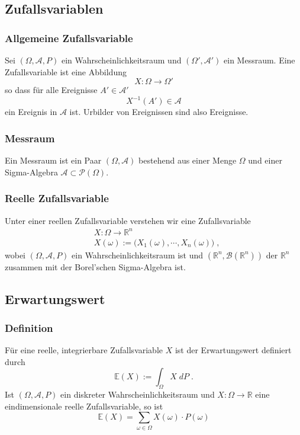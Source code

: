 \documentclass[a4paper]{article}
\begin{document}
\subsection{Zufallsvariablen}

\subsubsection{Allgemeine Zufallsvariable}
Sei $(\Omega, \mathcal{A}, P)$ ein Wahrscheinlichkeitsraum und $(\Omega', \mathcal{A}')$ ein Messraum. Eine Zufallsvariable ist eine Abbildung
$$X : \Omega \to \Omega'$$ 
so dass für alle Ereignisse $A' \in  \mathcal{A}'$
$$ X^{-1} (A') \in \mathcal{A}$$
 ein Ereignis in $\mathcal{A}$ ist. Urbilder von Ereignissen sind also Ereignisse.

\subsubsection{Messraum}
Ein Messraum ist ein Paar $(\Omega, \mathcal{A})$ bestehend aus einer Menge $\Omega$ und einer Sigma-Algebra $\mathcal{A} \subset \mathcal{P}(\Omega)$.

\subsubsection{Reelle Zufallsvariable}
Unter einer reellen Zufallsvariable verstehen wir eine Zufallsvariable 
\begin{align*}
& X : \Omega \to \mathbb{R}^n \\
& X(\omega) := \biggl(X_1(\omega), \cdots , X_n(\omega)  \biggr) \; ,
\end{align*}
wobei $(\Omega, \mathcal{A}, P)$ ein Wahrscheinlichkeitsraum ist und $(\mathbb{R}^n, \mathcal{B}(\mathbb{R}^n))$ der $\mathbb{R}^n$ zusammen mit der Borel'schen Sigma-Algebra ist.


\subsection{Erwartungswert}

\subsubsection{Definition}
Für eine reelle, integrierbare Zufallsvariable $X$ ist der Erwartungswert definiert durch
$$ \mathbb{E} (X) := \int_{\Omega} X \; dP \; .$$
Ist $(\Omega, \mathcal{A}, P)$ ein diskreter Wahrscheinlichkeitsraum und $X :\Omega \to \mathbb{R}$ eine eindimensionale reelle Zufallsvariable, so ist
$$ \mathbb{E} (X) = \sum_{\omega \in \Omega}  X(\omega) \cdot P(\omega)$$
\end{document}
